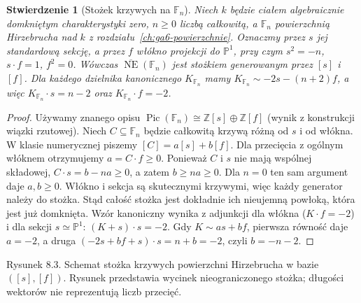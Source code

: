 \documentclass[11pt,a4paper,openany]{report}
\numberwithin{equation}{section}
\theoremstyle{plain}
\newtheorem{stwierdzenie}[twierdzenie]{Stwierdzenie}
\theoremstyle{definition}
\theoremstyle{remark}
\newcommand{\Z}{\mathbb Z}
\newcommand{\PP}{\mathbb P}
\begin{document}
\begin{stwierdzenie}[Stożek krzywych na $\mathbb F_n$]
\label{st:ga8-fn-cone}
Niech $k$ będzie ciałem algebraicznie domkniętym
charakterystyki zero, $n\ge0$ liczbą całkowitą, a
$\mathbb F_n$ powierzchnią Hirzebrucha nad $k$
z rozdziału~\ref{ch:ga6-powierzchnie}.
Oznaczmy przez $s$ jej standardową sekcję, a przez $f$
włókno projekcji do $\PP^1$, przy czym
$s^2=-n$, $s\cdot f=1$, $f^2=0$.
Wówczas $\overline{\operatorname{NE}}(\mathbb F_n)$
jest stożkiem generowanym przez $[s]$ i $[f]$.
Dla każdego dzielnika kanonicznego $K_{\mathbb F_n}$
mamy $K_{\mathbb F_n}\sim-2s-(n+2)f$,
a więc $K_{\mathbb F_n}\cdot s=n-2$ oraz
$K_{\mathbb F_n}\cdot f=-2$.
\end{stwierdzenie}
\begin{proof}
Używamy znanego opisu $\operatorname{Pic}(\mathbb F_n)
\cong\Z[s]\oplus\Z[f]$ (wynik z konstrukcji
wiązki rzutowej). Niech $C\subseteq\mathbb F_n$
będzie całkowitą krzywą różną od $s$ i od włókna.
W klasie numerycznej piszemy $[C]=a[s]+b[f]$.
Dla przecięcia z ogólnym włóknem otrzymujemy
$a=C\cdot f\ge0$. Ponieważ $C$ i $s$ nie mają
wspólnej składowej, $C\cdot s=b-na\ge0$,
a zatem $b\ge na\ge0$. Dla $n=0$ ten sam argument
daje $a,b\ge0$. Włókno i sekcja są skutecznymi
krzywymi, więc każdy generator należy do stożka.
Stąd całość stożka jest dokładnie ich nieujemną
powłoką, która jest już domknięta.
Wzór kanoniczny wynika z adjunkcji dla włókna
($K\cdot f=-2$) i dla sekcji $s\simeq\PP^1$:
$(K+s)\cdot s=-2$. Gdy $K\sim as+bf$, pierwsza
równość daje $a=-2$, a druga $(-2s+bf+s)\cdot s
=n+b=-2$, czyli $b=-n-2$.
\end{proof}

\begin{center}

{\small Rysunek 8.3. Schemat stożka krzywych powierzchni
Hirzebrucha w bazie $([s],[f])$. Rysunek przedstawia
wycinek nieograniczonego stożka; długości wektorów
nie reprezentują liczb przecięć.}\par
\end{center}
\end{document}
